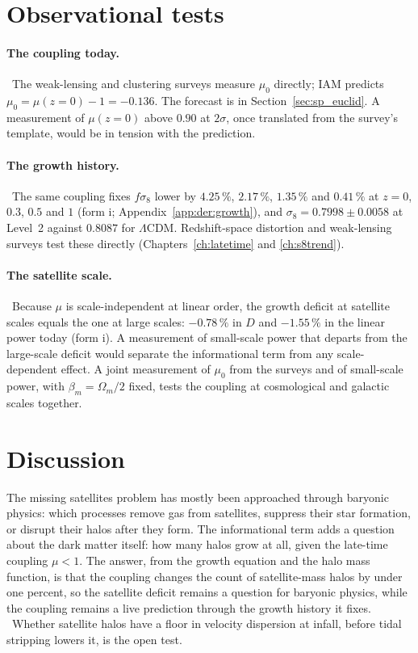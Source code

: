\section{Observational tests}\label{sec:ms_tests}
\paragraph{The coupling today.} \prediction\ The weak-lensing and clustering surveys measure $\mu_0$ directly; IAM predicts
$\mu_0=\mu(z=0)-1=-0.136$. The forecast is in Section~\ref{sec:sp_euclid}. A measurement of $\mu(z=0)$ above $0.90$ at $2\sigma$, once
translated from the survey's template, would be in tension with the prediction.

\paragraph{The growth history.} \prediction\ The same coupling fixes $f\sigma_8$ lower by $4.25\,\%$, $2.17\,\%$, $1.35\,\%$ and $0.41\,\%$ at $z=0$,
$0.3$, $0.5$ and $1$ (form i; Appendix~\ref{app:der:growth}), and $\sigma_8=0.7998\pm0.0058$ at Level~2 against $0.8087$ for $\Lambda$CDM. Redshift-space
distortion and weak-lensing surveys test these directly (Chapters~\ref{ch:latetime} and \ref{ch:s8trend}).

\paragraph{The satellite scale.} \prediction\ Because $\mu$ is scale-independent at linear order, the growth deficit at satellite scales equals the one at
large scales: $-0.78\,\%$ in $D$ and $-1.55\,\%$ in the linear power today (form i). A measurement of small-scale power that departs from the large-scale
deficit would separate the informational term from any scale-dependent effect. A joint measurement of $\mu_0$ from the surveys and of small-scale power,
with $\beta_m=\Omega_m/2$ fixed, tests the coupling at cosmological and galactic scales together.

\section{Discussion}\label{sec:ms_discussion}
The missing satellites problem has mostly been approached through baryonic physics: which processes remove gas from satellites, suppress their star
formation, or disrupt their halos after they form. The informational term adds a question about the dark matter itself: how many halos grow at all,
given the late-time coupling $\mu<1$. The answer, from the growth equation and the halo mass function, is that the coupling changes the count of
satellite-mass halos by under one percent, so the satellite deficit remains a question for baryonic physics, while the coupling remains a live
prediction through the growth history it fixes. \interp\ Whether satellite halos have a floor in velocity dispersion at infall, before tidal stripping lowers it, is the open test. \openprob

